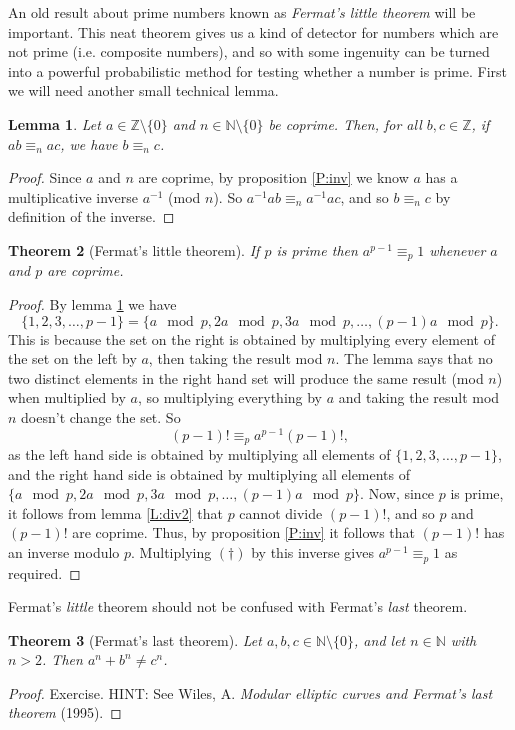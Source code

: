 \documentclass{article}
\theoremstyle{plain}
\newtheorem{theorem}{Theorem}[section]{\bfseries}{\itshape}
\newtheorem{lemma}[theorem]{Lemma}{\bfseries}{\upshape}
\newcommand{\bN}{\mathbb{N}}
\newcommand{\bZ}{\mathbb{Z}}
\begin{document}
An old result about prime numbers known as \emph{Fermat's little theorem} will be important. This neat theorem gives us a kind of detector for numbers which are not prime (i.e. composite numbers), and so with some ingenuity can be turned into a powerful probabilistic method for testing whether a number is prime. First we will need another small technical lemma. 
\begin{lemma}\label{L:distinct}
Let $a\in\bZ\setminus\{0\}$ and $n\in\bN\setminus\{0\}$ be coprime. Then, for all $b,c\in \bZ$, if $ab \equiv_n ac$, we have $b\equiv_n c$.
\end{lemma}
\begin{proof}
Since $a$ and $n$ are coprime, by proposition \ref{P:inv} we know $a$ has a multiplicative inverse $a^{-1}$ (mod $n$). So $a^{-1}ab \equiv_n a^{-1}ac$, and so $b\equiv_n c$ by definition of the inverse. 
\end{proof}

\begin{theorem}[Fermat's little theorem]\label{T:fermat}
If $p$ is prime then $a^{p-1}\equiv_p 1$ whenever $a$ and $p$ are coprime.
\end{theorem}
\begin{proof}
By lemma \ref{L:distinct} we have 
\[\{1,2,3,\ldots,p-1\}=\{a \mod p,2a \mod p,3a \mod p,\ldots, (p-1)a \mod p\}.\] 
This is because the set on the right is obtained by multiplying every element of the set on the left by $a$, then taking the result mod $n$. The lemma says that no two distinct elements in the right hand set will produce the same result (mod $n$) when multiplied by $a$, so multiplying everything by $a$ and taking the result mod $n$ doesn't change the set. 
So 
\[\tag{$\dagger$}(p-1)! \equiv_p a^{p-1}(p-1)!,\] as the left hand side is obtained by multiplying all elements of $\{1,2,3,\ldots,p-1\}$, and the right hand side is obtained by multiplying all elements of $\{a \mod p,2a \mod p,3a \mod p,\ldots, (p-1)a \mod p\}$. Now, since $p$ is prime, it follows from lemma \ref{L:div2} that $p$ cannot divide $(p-1)!$, and so $p$ and $(p-1)!$ are coprime. Thus, by proposition \ref{P:inv}  it follows that $(p-1)!$ has an inverse modulo $p$. Multiplying $(\dagger)$ by this inverse gives $a^{p-1}\equiv_p 1$ as required. 
\end{proof}

Fermat's \emph{little} theorem should not be confused with Fermat's \emph{last} theorem.

\begin{theorem}[Fermat's last theorem]
Let $a,b,c\in\bN\setminus\{0\}$, and let $n\in\bN$ with $n> 2$. Then $a^n+ b^n\neq c^n$.
\end{theorem}
\begin{proof}
Exercise. HINT: See Wiles, A. \emph{Modular elliptic curves and Fermat's last theorem} (1995).  
\end{proof}
\end{document}
